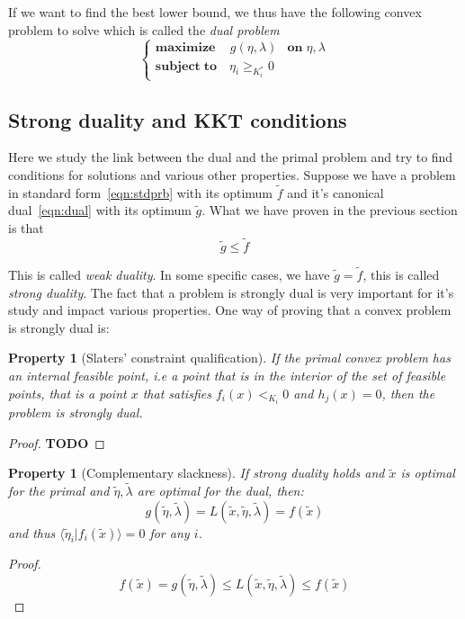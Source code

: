 \documentclass[10pt]{report}
\theoremstyle{plain}
\newtheorem{prop}[thm]{Property}
\theoremstyle{definition}
\theoremstyle{remark}
\newcommand{\TODO}{\textbf{TODO}}
\newcommand{\braket}[2]{\langle#1|#2\rangle}
\renewcommand{\geq}{\geqslant}
\renewcommand{\leq}{\leqslant}
\newcommand{\maxim}[3]{\begin{cases}
    \mathbf{maximize}\,\quad #1& \mathbf{on}\; #2\\
    \mathbf{subject\;to}\quad #3
  \end{cases}}
\begin{document}
If we want to find the best lower bound, we thus have the following convex
problem to solve which is called the \emph{dual problem}
\begin{equation}\label{eqn:dual}
\maxim{g(\eta,\lambda)}{\eta,\lambda}{\eta_i \geq_{K_i^*} 0}
\end{equation}

\subsection{Strong duality and KKT conditions}

Here we study the link between the dual and the primal problem and try to find
conditions for solutions and various other properties. Suppose we have a problem in
standard form~\ref{eqn:stdprb} with its optimum $\tilde f$ and it's canonical
dual~\ref{eqn:dual} with its optimum $\tilde g$. What we have proven in the
previous section is that
\[\tilde g \leq \tilde f\]

This is called \emph{weak duality}. In some specific cases, we have $\tilde g =
\tilde f$, this is called \emph{strong duality}. The fact that a problem is
strongly dual is very important for it's study and impact various properties.
One way of proving that a convex problem is strongly dual is:
\begin {prop}[Slaters' constraint qualification]\label{prop:slater}
  If the primal convex problem has an internal feasible point, i.e a point that is in
  the interior of the set of feasible points, that is a point $x$ that satisfies
  $f_i(x) <_{K_i} 0$ and $h_j(x) = 0$, then the problem is strongly dual.
\end{prop}

\begin{proof}
  \TODO{}
\end{proof}

\begin{prop}[Complementary slackness]
If strong duality holds and $\tilde x$ is optimal for the primal and $\tilde
\eta, \tilde{\lambda}$ are optimal for the dual, then:
\[g(\tilde \eta, \tilde{\lambda}) = L(\tilde x, \tilde{\eta},\tilde{\lambda}) = f(\tilde{x})\]
and thus $\braket {\tilde\eta_i}{f_i(\tilde{x})} = 0$ for any $i$.
\end{prop}

\begin{proof}
  \[ f(\tilde x) = g(\tilde \eta, \tilde{\lambda}) \leq
    L(\tilde x, \tilde{\eta},\tilde{\lambda}) \leq f(\tilde{x})\]
\end{proof}
\end{document}
